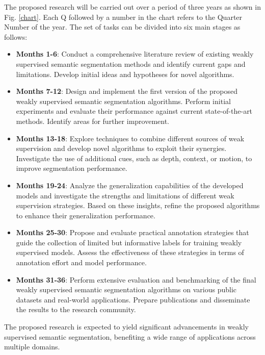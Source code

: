 \documentclass[11pt]{article}
\begin{document}
The proposed research will be carried out over a period of three years as shown in Fig. \ref{chart}. Each Q followed by a number in the chart refers to the Quarter Number of the year. The set of tasks can be divided into six main stages as follows:
\begin{itemize}
\item \textbf{Months 1-6}: Conduct a comprehensive literature review of existing weakly supervised semantic segmentation methods and identify current gaps and limitations. Develop initial ideas and hypotheses for novel algorithms.

\item \textbf{Months 7-12}: Design and implement the first version of the proposed weakly supervised semantic segmentation algorithms. Perform initial experiments and evaluate their performance against current state-of-the-art methods. Identify areas for further improvement.

\item \textbf{Months 13-18}: Explore techniques to combine different sources of weak supervision and develop novel algorithms to exploit their synergies. Investigate the use of additional cues, such as depth, context, or motion, to improve segmentation performance.

\item \textbf{Months 19-24}: Analyze the generalization capabilities of the developed models and investigate the strengths and limitations of different weak supervision strategies. Based on these insights, refine the proposed algorithms to enhance their generalization performance.

\item \textbf{Months 25-30}: Propose and evaluate practical annotation strategies that guide the collection of limited but informative labels for training weakly supervised models. Assess the effectiveness of these strategies in terms of annotation effort and model performance.

\item \textbf{Months 31-36}: Perform extensive evaluation and benchmarking of the final weakly supervised semantic segmentation algorithms on various public datasets and real-world applications. Prepare publications and disseminate the results to the research community.

\end{itemize}
The proposed research is expected to yield significant advancements in weakly supervised semantic segmentation, benefiting a wide range of applications across multiple domains.
\newpage
\printbibliography
\end{document}
